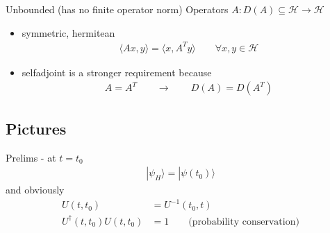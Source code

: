 \documentclass[../main.tex]{subfiles}
\begin{document}
Unbounded (has no finite operator norm) Operators $A:D(A) \subseteq \mathcal{H}\rightarrow\mathcal{H}$
\begin{itemize}
\item symmetric, hermitean
\begin{align}
\langle Ax,y\rangle=\langle x,A^Ty\rangle\qquad\forall x,y\in\mathcal{H}
\end{align}
\item selfadjoint is a stronger requirement because
\begin{align}
A=A^T\qquad\rightarrow\qquad D(A)=D(A^T)
\end{align}
\end{itemize}



\subsection{Pictures}
Prelims - at $t=t_0$
\begin{align}
|\psi_H\rangle=|\psi(t_0)\rangle
\end{align}
and obviously
\begin{align}
U(t,t_0)&=U^{-1}(t_0,t)\\
U^\dagger(t,t_0)U(t,t_0)&=1\qquad\text{(probability conservation)}
\end{align}
\end{document}
